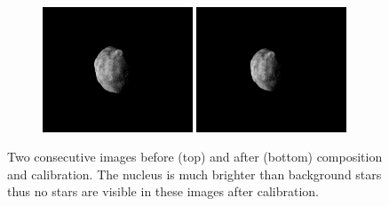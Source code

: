 \begin{figure}[htb]
\begin{subfigure}[b]{\textwidth}
        \centering
        \includegraphics[width=0.49\textwidth]{doc/thesis/0_figures/rendering_lighting/Inst_2017-08-15T115858-281000.png}
        \includegraphics[width=0.49\textwidth]{doc/thesis/0_figures/rendering_lighting/Inst_2017-08-15T115859-288000.png}
    \end{subfigure}
    \caption{Two consecutive images before (top) and after (bottom) composition and calibration. The nucleus is much brighter than background stars thus no stars are visible in these images after calibration.}
    \label{fig:composition_before_after}
\end{figure}

